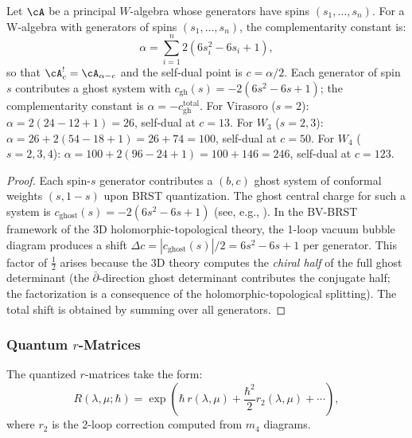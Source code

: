 \begin{theorem}
Let\/ $\cA$ be a principal $W$-algebra whose generators have spins
$(s_1,\ldots,s_n)$.
For a W-algebra with generators of spins $(s_1, \ldots, s_n)$, the complementarity constant is:
\begin{equation}
\alpha = \sum_{i=1}^n 2(6s_i^2 - 6s_i + 1),
\end{equation}
so that $\cA_c^! = \cA_{\alpha - c}$ and the self-dual point is $c = \alpha/2$.
Each generator of spin~$s$ contributes a ghost system with $c_{\mathrm{gh}}(s) = -2(6s^2 - 6s + 1)$;
the complementarity constant is $\alpha = -c_{\mathrm{gh}}^{\mathrm{total}}$.
For Virasoro ($s=2$): $\alpha = 2(24 - 12 + 1) = 26$, self-dual at $c = 13$. For $W_3$ ($s=2,3$): $\alpha = 26 + 2(54 - 18 + 1) = 26 + 74 = 100$, self-dual at $c = 50$. For $W_4$ ($s=2,3,4$): $\alpha = 100 + 2(96 - 24 + 1) = 100 + 146 = 246$, self-dual at $c = 123$.
\end{theorem}

\begin{proof}
Each spin-$s$ generator contributes a $(b,c)$ ghost system of conformal weights $(s, 1-s)$ upon BRST quantization. The ghost central charge for such a system is $c_{\text{ghost}}(s) = -2(6s^2 - 6s + 1)$ (see, e.g., \cite{FMS86,Pol98}). In the BV-BRST framework of the 3D holomorphic-topological theory, the 1-loop vacuum bubble diagram produces a shift $\Delta c = |c_{\text{ghost}}(s)|/2 = 6s^2 - 6s + 1$ per generator. This factor of $\tfrac{1}{2}$ arises because the 3D theory computes the \emph{chiral half} of the full ghost determinant (the $\bar\partial$-direction ghost determinant contributes the conjugate half; the factorization is a consequence of the holomorphic-topological splitting). The total shift is obtained by summing over all generators.
\end{proof}

\subsubsection{Quantum $r$-Matrices}

The quantized $r$-matrices take the form:
\begin{equation}
R(\lambda,\mu; \hbar) = \exp\left( \hbar \, r(\lambda,\mu) + \frac{\hbar^2}{2} r_2(\lambda,\mu) + \cdots \right),
\end{equation}
where $r_2$ is the 2-loop correction computed from $m_4$ diagrams.

